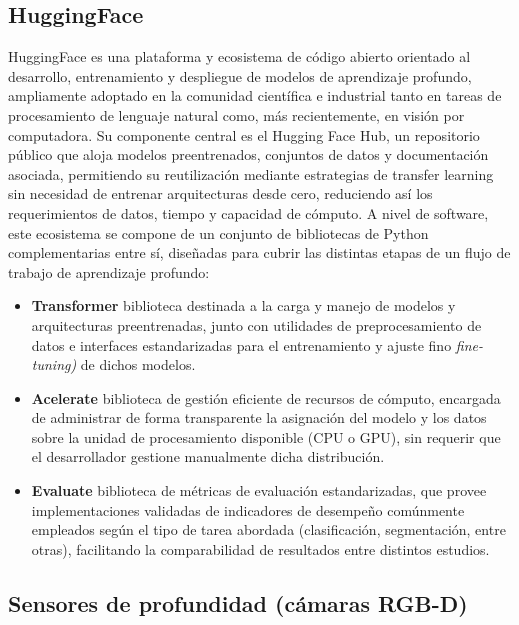 \subsection{HuggingFace}
HuggingFace es una plataforma y ecosistema de código abierto orientado al desarrollo, entrenamiento y despliegue de modelos de aprendizaje profundo, ampliamente adoptado en la comunidad científica e industrial tanto en tareas de procesamiento de lenguaje natural como, más recientemente, en visión por computadora.
Su componente central es el Hugging Face Hub, un repositorio público que aloja modelos preentrenados, conjuntos de datos y documentación asociada, permitiendo su reutilización mediante estrategias de transfer learning sin necesidad de entrenar arquitecturas desde cero, reduciendo así los requerimientos de datos, tiempo y capacidad de cómputo.
A nivel de software, este ecosistema se compone de un conjunto de bibliotecas de Python complementarias entre sí, diseñadas para cubrir las distintas etapas de un flujo de trabajo de aprendizaje profundo:
\begin{itemize}
	\item \textbf{Transformer} biblioteca destinada a la carga y manejo de modelos y arquitecturas preentrenadas, junto con utilidades de preprocesamiento de datos e interfaces estandarizadas para el entrenamiento y ajuste fino \textit{fine-tuning)} de dichos modelos.
	\item \textbf{Acelerate} biblioteca de gestión eficiente de recursos de cómputo, encargada de administrar de forma transparente la asignación del modelo y los datos sobre la unidad de procesamiento disponible (CPU o GPU), sin requerir que el desarrollador gestione manualmente dicha distribución.
	\item \textbf{Evaluate} biblioteca de métricas de evaluación estandarizadas, que provee implementaciones validadas de indicadores de desempeño comúnmente empleados según el tipo de tarea abordada (clasificación, segmentación, entre otras), facilitando la comparabilidad de resultados entre distintos estudios.
\end{itemize}

\subsection{Sensores de profundidad (cámaras RGB-D)}

